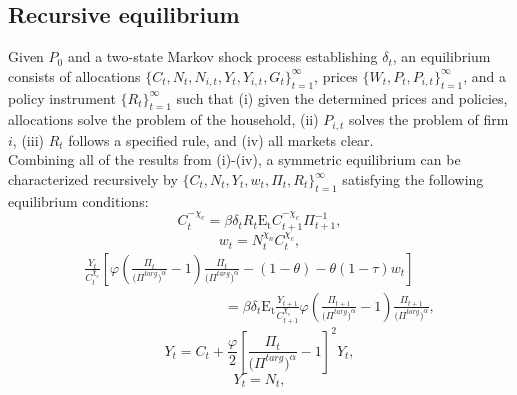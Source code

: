 \documentclass[11pt]{article}
\begin{document}
\begin{singlespace}
		\subsection{Recursive equilibrium}

		\normalsize{Given \(P_{0}\) and a two-state Markov shock process establishing \(\delta_{t}\), an equilibrium consists of allocations \(\{C_{t},N_{t},N_{i,t},Y_{t},Y_{i,t},G_{t}\}_{t=1}^{\infty}\), prices \(\{W_{t},P_{t},P_{i,t}\}_{t=1}^{\infty}\), and a policy instrument \(\{R_{t}\}_{t=1}^{\infty}\) such that (i) given the determined prices and policies, allocations solve the problem of the household, (ii) \(P_{i,t}\) solves the problem of firm \(i\), (iii) \(R_{t}\) follows a specified rule, and (iv) all markets clear.}\\

		\normalsize{Combining all of the results from (i)-(iv), a symmetric equilibrium can be characterized recursively by \(\{C_{t},N_{t},Y_{t},w_{t},\Pi_{t},R_{t}\}^{\infty}_{t=1}\) satisfying the following equilibrium conditions:}
		\begin{equation}
			C_{t}^{-\chi_{c}} = \beta\delta_{t}R_{t}\mathrm{E_{t}}C_{t+1}^{-\chi_{c}}\Pi_{t+1}^{-1},\label{eq:CEE_a}
		\end{equation}
		\begin{equation}
			w_{t}=N_{t}^{\chi_{n}}C_{t}^{\chi_{c}},\label{eq:IOC_a}
		\end{equation}
		\begin{equation}
			\begin{multlined}
				\frac{Y_{t}}{C_{t}^{\chi_{c}}}\left[\varphi \left(\frac{\Pi_{t}}{\bigl(\Pi^{targ}\bigr)^{\alpha}}-1\right)\frac{\Pi_{t}}{\bigl(\Pi^{targ}\bigr)^{\alpha}} - (1-\theta)-\theta (1-\tau)w_{t}\right]\\
				\hspace{10em}=
				\beta\delta_{t}\mathrm{E_{t}}\frac{Y_{t+1}}{C_{t+1}^{\chi_{c}}}\varphi \left(\frac{\Pi_{t+1}}{\bigl(\Pi^{targ}\bigr)^{\alpha}}-1\right)\frac{\Pi_{t+1}}{\bigl(\Pi^{targ}\bigr)^{\alpha}},\label{eq:FLPC_a}
			\end{multlined}
		\end{equation}
		\begin{equation}
			Y_{t} = C_{t} + \frac{\varphi}{2}\left[\frac{\Pi_{t}}{\bigl(\Pi^{targ}\bigr)^{\alpha}}-1\right]^{2}Y_{t},\label{eq:ARC_a}
		\end{equation}
		\begin{equation}
			Y_{t}=N_{t}, \label{eq:APF_a}
		\end{equation}

\end{singlespace}
\end{document}

